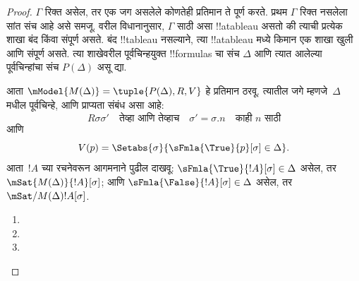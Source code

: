 \documentclass[../../../include/open-logic-section]{subfiles}
\begin{document}
\begin{proof}
$\Gamma$ रिक्त असेल, तर एक जग असलेले कोणतेही प्रतिमान
ते पूर्ण करते. प्रथम $\Gamma$ रिक्त नसलेला सांत संच आहे
असे समजू. वरील विधानानुसार, $\Gamma$ साठी असा
!!a{tableau} असतो की त्याची प्रत्येक शाखा
बंद किंवा संपूर्ण असते. बंद !!{tableau} नसल्याने,
त्या !!a{tableau} मध्ये किमान एक शाखा
खुली आणि संपूर्ण असते. त्या शाखेवरील
पूर्वचिन्हयुक्त !!{formula}s चा संच
$\Delta$ आणि त्यात आलेल्या पूर्वचिन्हांचा
संच $P(\Delta)$ असू द्या.

आता $\mModel{M(\Delta)} = \tuple{P(\Delta), R, V}$
हे प्रतिमान ठरवू. त्यातील जगे म्हणजे~$\Delta$
मधील पूर्वचिन्हे, आणि प्राप्यता संबंध असा आहे:
\[
R\sigma\sigma' \quad \text{तेव्हा आणि तेव्हाच} \quad
\sigma'=\sigma.n \quad \text{काही~$n$ साठी}
\]
आणि
\[
V(p) = \Setabs{\sigma}{\sFmla{\True}{p}[\sigma] \in \Delta}.
\]
आता~$!A$ च्या रचनेवरून आगमनाने पुढील
दाखवू: $\sFmla{\True}{!A}[\sigma] \in
\Delta$ असेल, तर
$\mSat{M(\Delta)}{!A}[\sigma]$; आणि
$\sFmla{\False}{!A}[\sigma] \in \Delta$
असेल, तर $\mSat/{M(\Delta)}{!A}[\sigma]$.

\begin{enumerate}
  \item {}
  \item {}
  \item {}
\end{enumerate}
\end{proof}
\end{document}
